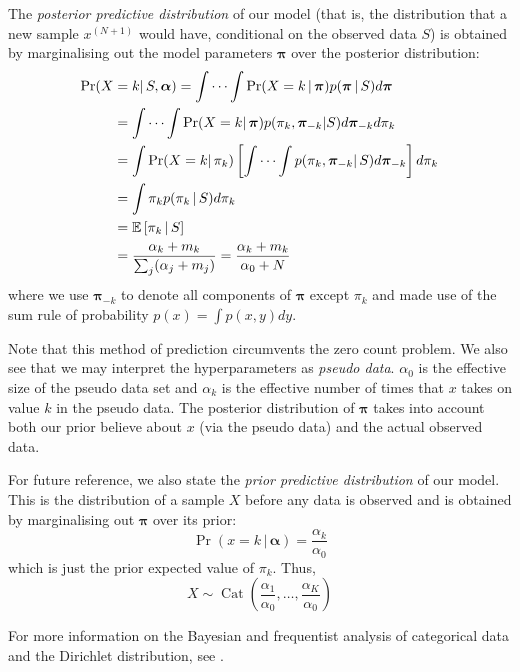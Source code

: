 \documentclass[final,3p,times,twocolumn]{elsarticle}
\DeclareMathOperator*{\Cat}{Cat}
\let\bs\boldsymbol
\begin{document}
The \emph{posterior predictive distribution} of our model (that is, the distribution that a new sample $x^{(N+1)}$ would have, conditional on the observed data $S$) is obtained by marginalising out the model parameters $\bs \pi$ over the posterior distribution:
\begin{equation*}
\begin{split}
\Pr(X &= k |\,S, \bs \alpha) = \idotsint \Pr(X = k\,|\,\bs \pi)p(\bs \pi \,|\,S)d\bs\pi\\
&= \idotsint \Pr(X=k|\,\bs\pi)p(\pi_k,\bs\pi_{-k}|S)d\bs\pi_{-k}d\pi_k\\
&= \int \Pr(X = k|\,\pi_k)\left[\idotsint p(\pi_k,\bs\pi_{-k}|\,S)d\bs\pi_{-k}\right]d\pi_k\\
&= \int \pi_k p(\pi_k\,|\,S)d\pi_k\\
&= \mathbb{E}\left[\pi_k\,|\,S\right]\\
&= \frac{\alpha_k + m_k}{\sum_j (\alpha_j+m_j)} = \frac{\alpha_k+m_k}{\alpha_0 + N}
\end{split}
\end{equation*}
where we use $\bs \pi_{-k}$ to denote all components of $\bs \pi$ except $\pi_k$ and made use of the sum rule of probability $p(x) = \int p(x,y)dy$.

Note that this method of prediction circumvents the zero count problem.
We also see that we may interpret the hyperparameters as \emph{pseudo data}.
$\alpha_0$ is the effective size of the pseudo data set and $\alpha_k$ is the effective number of times that $x$ takes on value $k$ in the pseudo data.
The posterior distribution of $\bs \pi$ takes into account both our prior believe about $x$ (via the pseudo data) and the actual observed data.

For future reference, we also state the \emph{prior predictive distribution} of our model.
This is the distribution of a sample $X$ before any data is observed and is obtained by marginalising out $\bs \pi$ over its prior:
\begin{equation*}
\Pr(x = k\,|\,\bs \alpha) = \frac{\alpha_k}{\alpha_0}
\end{equation*}
which is just the prior expected value of $\pi_k$.
Thus,
\begin{equation*}
X \sim \Cat\left(\frac{\alpha_1}{\alpha_0},\dots,\frac{\alpha_K}{\alpha_0}\right)
\end{equation*}

For more information on the Bayesian and frequentist analysis of categorical data and the Dirichlet distribution, see \cite{Bishop, Murphy}.
\end{document}
